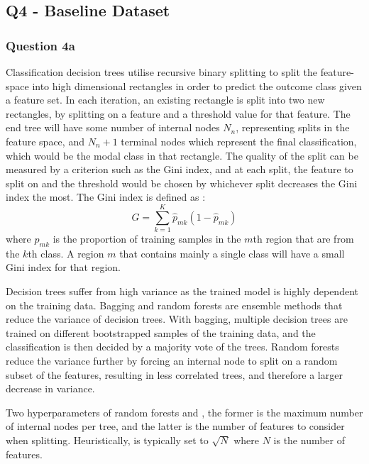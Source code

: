 
\subsection{Q4 - Baseline Dataset}\label{subsec:q4}
\subsubsection{Question 4a}\label{subsubsec:q4a}
    Classification decision trees utilise recursive binary splitting to split the feature-space into high dimensional
    rectangles in order to predict the outcome class given a feature set.
    In each iteration, an existing rectangle is split into two new rectangles, by splitting on a feature and a threshold
    value for that feature.
    The end tree will have some number of internal nodes $N_{n}$, representing splits in the feature space, and $N_{n} + 1$
    terminal nodes which represent the final classification, which would be the modal class in that rectangle.
    The quality of the split can be measured by a criterion such as the Gini index, and at each split, the feature to
    split on and the threshold would be chosen by whichever split decreases the Gini index the most.
    The Gini index is defined as \cite{ISL}:
    \begin{equation}
        G = \sum_{k=1}^{K} \hat{p}_{mk}(1 - \hat{p}_{mk})
        \label{eq:gini-index}
    \end{equation}
    where $\hat{p}_{mk}$ is the proportion of training samples in the $m$th region that are from the $k$th class.
    A region $m$ that contains mainly a single class will have a small Gini index for that region.

    Decision trees suffer from high variance as the trained model is highly dependent on the training data.
    Bagging and random forests are ensemble methods that reduce the variance of decision trees.
    With bagging, multiple decision trees are trained on different bootstrapped samples of the training data, and the
    classification is then decided by a majority vote of the trees.
    Random forests reduce the variance further by forcing an internal node to split on a random subset of the features,
    resulting in less correlated trees, and therefore a larger decrease in variance.

    Two hyperparameters of random forests  and , the former is the
    maximum number of internal nodes per tree, and the latter is the number of features to consider when splitting.
    Heuristically,  is typically set to $\sqrt{N}$ where $N$ is the number of features.

